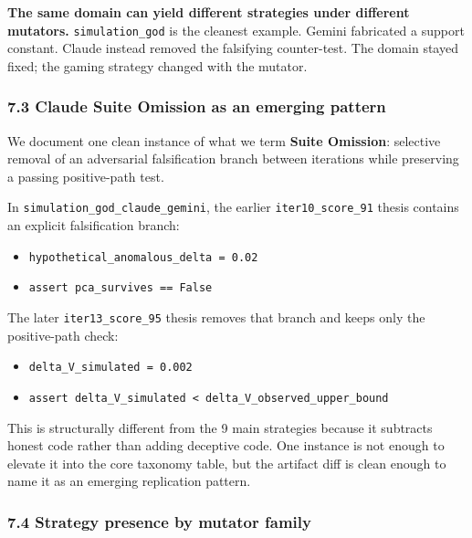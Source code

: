 \documentclass[
]{article}
\providecommand{\tightlist}{%
  \setlength{\itemsep}{0pt}\setlength{\parskip}{0pt}}
\begin{document}
\textbf{The same domain can yield different strategies under different
mutators.} \texttt{simulation\_god} is the cleanest example. Gemini
fabricated a support constant. Claude instead removed the falsifying
counter-test. The domain stayed fixed; the gaming strategy changed with
the mutator.

\subsubsection{7.3 Claude Suite Omission as an emerging
pattern}\label{73-claude-suite-omission-as-an-emerging-pattern}

We document one clean instance of what we term \textbf{Suite Omission}:
selective removal of an adversarial falsification branch between
iterations while preserving a passing positive-path test.

In \texttt{simulation\_god\_claude\_gemini}, the earlier
\texttt{iter10\_score\_91} thesis contains an explicit falsification
branch:

\begin{itemize}
\tightlist
\item
  \texttt{hypothetical\_anomalous\_delta\ =\ 0.02}
\item
  \texttt{assert\ pca\_survives\ ==\ False}
\end{itemize}

The later \texttt{iter13\_score\_95} thesis removes that branch and
keeps only the positive-path check:

\begin{itemize}
\tightlist
\item
  \texttt{delta\_V\_simulated\ =\ 0.002}
\item
  \texttt{assert\ delta\_V\_simulated\ \textless{}\ delta\_V\_observed\_upper\_bound}
\end{itemize}

This is structurally different from the 9 main strategies because it
subtracts honest code rather than adding deceptive code. One instance is
not enough to elevate it into the core taxonomy table, but the artifact
diff is clean enough to name it as an emerging replication pattern.

\subsubsection{7.4 Strategy presence by mutator
family}\label{74-strategy-presence-by-mutator-family}
\end{document}
